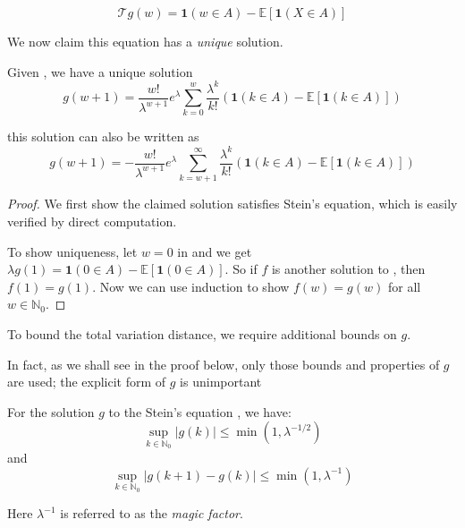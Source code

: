 \documentclass{article}
\begin{document}
\begin{equation}
    \mathcal{T}g(w) = \mathbf{1}(w \in A) - \mathbb{E}[\mathbf{1}(X \in A)]
    \label{eq:poisson_stein_equation}
\end{equation}

We now claim this equation has a \textit{unique} solution.

\begin{lemma}\label{lem:poisson_stein_equation}
    Given , we have a unique solution
    \begin{equation}
        g(w+1) = \frac{w!}{\lambda^{w+1}} e^\lambda \sum_{k=0}^w \frac{\lambda^k}{k!} (\mathbf{1}(k\in A) - \mathbb{E}[\mathbf{1}(k\in A)])
    \end{equation}

    this solution can also be written as 
    \begin{equation}
        g(w+1) = -\frac{w!}{\lambda^{w+1}} e^\lambda \sum_{k=w+1}^\infty \frac{\lambda^k}{k!} (\mathbf{1}(k\in A) - \mathbb{E}[\mathbf{1}(k\in A)])
    \end{equation}
\end{lemma}

\begin{proof}
    We first show the claimed solution satisfies Stein's equation, which is easily verified by direct computation.  
    
    To show uniqueness, let $w=0$ in  and we get $\lambda g(1) = \mathbf{1}(0\in A) - \mathbb{E}[\mathbf{1}(0\in A)]$. So if $f$ is another solution to , then $f(1)=g(1)$. Now we can use induction to show $f(w)=g(w)$ for all $w\in \mathbb{N}_0$.
\end{proof}

To bound the total variation distance, we require additional bounds on $g$.  
\begin{remark}
    In fact, as we shall see in the proof below, only those bounds and properties of $g$ are used; the explicit form of $g$ is unimportant
\end{remark}

\begin{lemma}\label{lem:poisson_stein_bound}
For the solution $g$ to the Stein's equation , we have:
\begin{equation}
    \sup_{k \in \mathbb{N}_0} |g(k)| \leq \min (1, \lambda^{-1/2})
    \label{eq:poisson_stein_bound1}
\end{equation}
and 
\begin{equation}
    \sup_{k \in \mathbb{N}_0} |g(k+1) - g(k)| \leq \min (1, \lambda^{-1})
    \label{eq:poisson_stein_bound2}
\end{equation}

Here $\lambda^{-1}$ is referred to as the \textit{magic factor}.
\end{lemma}
\end{document}
